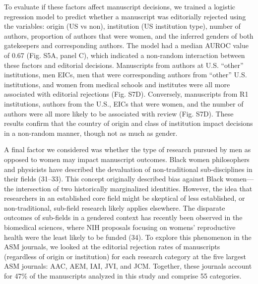 \documentclass[11pt,]{article}
\begin{document}
To evaluate if these factors affect manuscript decisions, we trained a
logistic regression model to predict whether a manuscript was
editorially rejected using the variables: origin (US vs non),
institution (US institution type), number of authors, proportion of
authors that were women, and the inferred genders of both gatekeepers
and corresponding authors. The model had a median AUROC value of 0.67
(Fig. S5A, panel C), which indicated a non-random interaction between
these factors and editorial decisions. Manuscripts from authors at U.S.
``other'' institutions, men EICs, men that were corresponding authors
from ``other'' U.S. institutions, and women from medical schools and
institutes were all more associated with editorial rejections (Fig.
S7D). Conversely, manuscripts from R1 institutions, authors from the
U.S., EICs that were women, and the number of authors were all more
likely to be associated with review (Fig. S7D). These results confirm
that the country of origin and class of institution impact decisions in
a non-random manner, though not as much as gender.

A final factor we considered was whether the type of research pursued by
men as opposed to women may impact manuscript outcomes. Black women
philosophers and physicists have described the devaluation of
non-traditional sub-disciplines in their fields (31--33). This concept
originally described bias against Black women---the intersection of two
historically marginalized identities. However, the idea that researchers
in an established core field might be skeptical of less established, or
non-traditional, sub-field research likely applies elsewhere. The
disparate outcomes of sub-fields in a gendered context has recently been
observed in the biomedical sciences, where NIH proposals focusing on
womens' reproductive health were the least likely to be funded (34). To
explore this phenomenon in the ASM journals, we looked at the editorial
rejection rates of manuscripts (regardless of origin or institution) for
each research category at the five largest ASM journals: AAC, AEM, IAI,
JVI, and JCM. Together, these journals account for 47\% of the
manuscripts analyzed in this study and comprise 55 categories.
\end{document}
